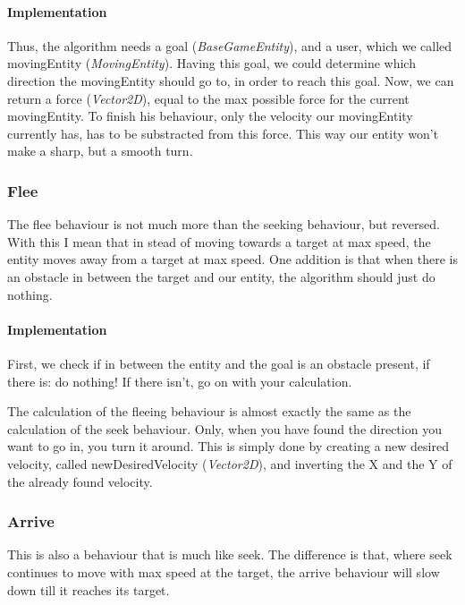 \documentclass[11pt]{extarticle}
\begin{document}
    \paragraph{Implementation}
    Thus, the algorithm needs a goal (\textit{BaseGameEntity}), and a user, which we called movingEntity (\textit{MovingEntity}).
    Having this goal, we could determine which direction the movingEntity should go to, in order to reach this goal.
    Now, we can return a force (\textit{Vector2D}), equal to the max possible force for the current movingEntity.
    To finish his behaviour, only the velocity our movingEntity currently has, has to be substracted from this force.
    This way our entity won't make a sharp, but a smooth turn.
    
    \subsubsection{Flee}
    The flee behaviour is not much more than the seeking behaviour, but reversed.
    With this I mean that in stead of moving towards a target at max speed, the entity moves away from a target at max speed.
    One addition is that when there is an obstacle in between the target and our entity, the algorithm should just do nothing.
    
    \paragraph{Implementation}
    First, we check if in between the entity and the goal is an obstacle present, if there is: do nothing!
    If there isn't, go on with your calculation.
    
    The calculation of the fleeing behaviour is almost exactly the same as the calculation of the seek behaviour.
    Only, when you have found the direction you want to go in, you turn it around.
    This is simply done by creating a new desired velocity, called newDesiredVelocity (\textit{Vector2D}), and inverting the X and the Y of the already found velocity.
    
    \subsubsection{Arrive}
    This is also a behaviour that is much like seek.
    The difference is that, where seek continues to move with max speed at the target, the arrive behaviour will slow down till it reaches its target.
    
\end{document}
